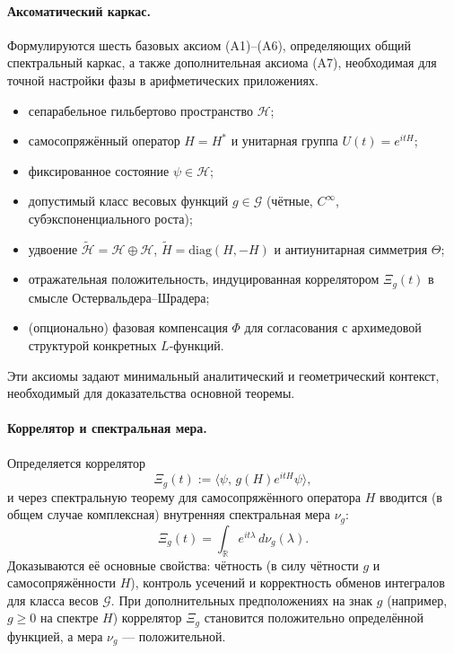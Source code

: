 \documentclass{article}
\numberwithin{equation}{section}
\theoremstyle{plain}
\theoremstyle{definition}
\theoremstyle{remark}
\def\infty{∞}\def\partial{∂}\def\sum{Σ}\def\int{∫}%
\begin{document}
\paragraph{Аксоматический каркас.}
Формулируются шесть базовых аксиом (A1)–(A6), определяющих общий спектральный каркас,
а также дополнительная аксиома (A7), необходимая для точной настройки фазы
в арифметических приложениях.
\begin{itemize}
  \item[(A1)] сепарабельное гильбертово пространство $\mathcal H$;
  \item[(A2)] самосопряжённый оператор $H=H^\ast$ и унитарная группа $U(t)=e^{itH}$;
  \item[(A3)] фиксированное состояние $\psi\in\mathcal H$;
  \item[(A4)] допустимый класс весовых функций $g\in\mathcal G$
  (чётные, $C^\infty$, субэкспоненциального роста);
  \item[(A5)] удвоение $\widetilde{\mathcal H}=\mathcal H\oplus\mathcal H$,
  $\widetilde H=\mathrm{diag}(H,-H)$ и антиунитарная симметрия $\Theta$;
  \item[(A6)] отражательная положительность, индуцированная коррелятором $\Xi_g(t)$
  в смысле Остервальдера–Шрадера;
  \item[(A7)] (опционально) фазовая компенсация $\Phi$ для согласования
  с архимедовой структурой конкретных $L$-функций.
\end{itemize}
Эти аксиомы задают минимальный аналитический и геометрический контекст,
необходимый для доказательства основной теоремы.

\paragraph{Коррелятор и спектральная мера.}
Определяется коррелятор
\begin{equation}
\Xi_g(t):=\langle\psi,\,g(H)e^{itH}\psi\rangle,
\end{equation}
и через спектральную теорему для самосопряжённого оператора $H$
вводится (в общем случае комплексная) внутренняя спектральная мера $\nu_g$:
\begin{equation}
\Xi_g(t)=\int_{\mathbb R} e^{it\lambda}\,d\nu_g(\lambda).
\end{equation}
Доказываются её основные свойства: чётность (в силу чётности $g$ и самосопряжённости $H$),
контроль усечений и корректность обменов интегралов
для класса весов $\mathcal G$.
При дополнительных предположениях на знак $g$ (например, $g\ge 0$ на спектре $H$)
коррелятор $\Xi_g$ становится положительно определённой функцией,
а мера $\nu_g$ — положительной.
\end{document}
